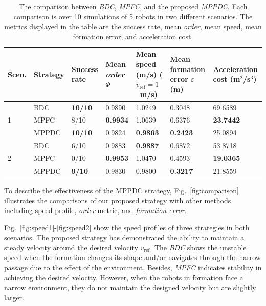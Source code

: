 \begin{table}
\centering
\caption{The comparison between \textit{BDC}, \textit{MPFC}, and the proposed \textit{MPPDC}. Each comparison is over 10 simulations of 5 robots in two
different scenarios. The metrics displayed in the table are
the success rate, mean \textit{order}, mean speed, mean formation error, and acceleration cost.}
\label{tbl:analys}
\begin{tabular}{C{0.6cm}C{1.2cm}C{1.8cm}C{1.8cm}C{2.5cm}C{2.3cm}C{1.8cm}}
\hline \hline
Scen.             & Strategy & Success rate  & Mean \textit{order} $\Phi$ & Mean speed (m/s) ($v_\text{ref}=1$~m/s) & Mean formation error $\varepsilon$ (m) & Acceleration cost (m$^2$/s$^3$) \\ \hline
{} & BDC      & \textbf{10/10} & 0.9890     & 1.0249     & 0.3048               & 69.6589    \\
                     & MPFC     & 8/10  & \textbf{0.9934}     & 1.0639     & 0.6376               & \textbf{23.7442}    \\
                     & MPPDC    & \textbf{10/10} & 0.9824     & \textbf{0.9863}     & \textbf{0.2423}               & 25.0894    \\ \hline
{}   & BDC      & 6/10  & 0.9883     & \textbf{0.9887}     & 0.6872               & 53.8718    \\
                     & MPFC     & 0/10  & \textbf{0.9953}     & 1.0470      & 0.4593               & \textbf{19.0365}    \\
                     & MPPDC    & \textbf{9/10}  & 0.9830     & 0.9800       & \textbf{0.3217}               & 21.8559   \\ \hline \hline
\end{tabular}
\end{table}

To describe the effectiveness of the MPPDC strategy, Fig.~\ref{fig:comparison} illustrates the comparisons of our proposed strategy with other methods including speed profile, \textit{order} metric, and \textit{formation error}. 

Fig.~\ref{fig:speed1}-\ref{fig:speed2} show the speed profiles of three strategies in both scenarios. The proposed strategy has demonstrated the ability to maintain a steady velocity around the desired velocity $v_\text{ref}$. The \textit{BDC} shows the unstable speed when the formation changes its shape and/or navigates through the narrow passage due to the effect of the environment. Besides, \textit{MPFC} indicates stability in achieving the desired velocity. However, when the robots in formation face a narrow environment, they do not maintain the designed velocity but are slightly larger.

